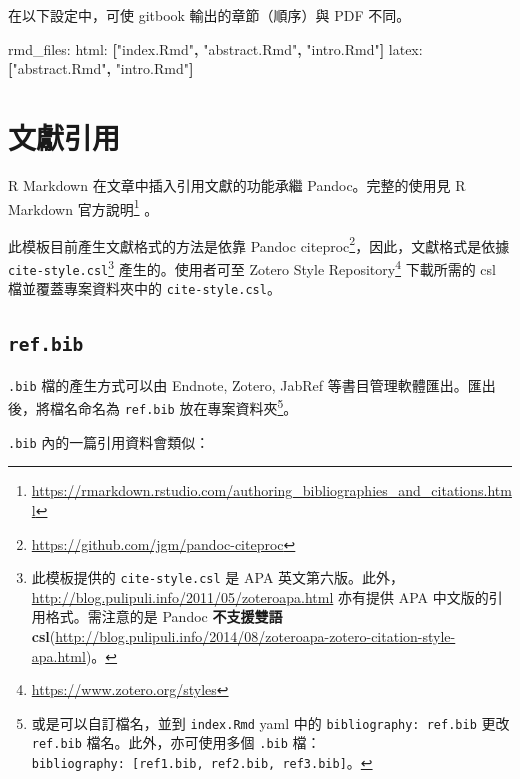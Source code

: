 \documentclass[oneside]{book}
\newenvironment{Shaded}{\begin{snugshade}}{\end{snugshade}}
\newcommand{\KeywordTok}[1]{\textcolor[rgb]{0.13,0.29,0.53}{\textbf{#1}}}
\newcommand{\StringTok}[1]{\textcolor[rgb]{0.31,0.60,0.02}{#1}}
\newcommand{\FunctionTok}[1]{\textcolor[rgb]{0.00,0.00,0.00}{#1}}
\newcommand{\AttributeTok}[1]{\textcolor[rgb]{0.77,0.63,0.00}{#1}}
\renewcommand{\href}[2]{#2\footnote{\url{#1}}}
\theoremstyle{definition}
\theoremstyle{definition}
\theoremstyle{definition}
\theoremstyle{remark}
\begin{document}
在以下設定中，可使 gitbook 輸出的章節（順序）與 PDF 不同。

\begin{Shaded}
\begin{Highlighting}[]
\FunctionTok{rmd_files:}
  \FunctionTok{html:}\AttributeTok{ }\KeywordTok{[}\StringTok{"index.Rmd"}\KeywordTok{,} \StringTok{"abstract.Rmd"}\KeywordTok{,} \StringTok{"intro.Rmd"}\KeywordTok{]}
  \FunctionTok{latex:}\AttributeTok{ }\KeywordTok{[}\StringTok{"abstract.Rmd"}\KeywordTok{,} \StringTok{"intro.Rmd"}\KeywordTok{]}
\end{Highlighting}
\end{Shaded}

\section{文獻引用}\label{bib-cite}

R Markdown 在文章中插入引用文獻的功能承繼 Pandoc。完整的使用見
\href{https://rmarkdown.rstudio.com/authoring_bibliographies_and_citations.html}{R
Markdown 官方說明} 。

此模板目前產生文獻格式的方法是依靠
\href{https://github.com/jgm/pandoc-citeproc}{Pandoc
citeproc}，因此，文獻格式是依據 \texttt{cite-style.csl}\footnote{此模板提供的
  \texttt{cite-style.csl} 是 APA
  英文第六版。此外，\url{http://blog.pulipuli.info/2011/05/zoteroapa.html}
  亦有提供 APA 中文版的引用格式。需注意的是 Pandoc \textbf{不支援雙語
  csl}(\url{http://blog.pulipuli.info/2014/08/zoteroapa-zotero-citation-style-apa.html})。}
產生的。使用者可至 \href{https://www.zotero.org/styles}{Zotero Style
Repository} 下載所需的 csl 檔並覆蓋專案資料夾中的
\texttt{cite-style.csl}。

\subsection{\texorpdfstring{\texttt{ref.bib}}{ref.bib}}\label{ref-bib}

\texttt{.bib} 檔的產生方式可以由 Endnote, Zotero, JabRef
等書目管理軟體匯出。匯出後，將檔名命名為 \texttt{ref.bib}
放在專案資料夾\footnote{或是可以自訂檔名，並到 \texttt{index.Rmd} yaml
  中的 \texttt{bibliography:\ ref.bib} 更改 \texttt{ref.bib}
  檔名。此外，亦可使用多個 \texttt{.bib}
  檔：\texttt{bibliography:\ {[}ref1.bib,\ ref2.bib,\ ref3.bib{]}}。}。

\texttt{.bib} 內的一篇引用資料會類似：
\end{document}

